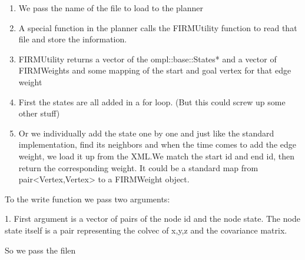 \begin{enumerate}
 \item We pass the name of the file to load to the planner
 \item A special function in the planner calls the FIRMUtility function to read that file and store the information.
 \item FIRMUtility returns a vector of the ompl::base::States* and a vector of FIRMWeights and some mapping of the start and goal vertex for that edge weight
 \item First the states are all added in a for loop. (But this could screw up some other stuff)
 \item Or we individually add the state one by one and just like the standard implementation, find its neighbors and when the time comes to add the edge weight, we load it up from the 
       XML.We match the start id and end id, then return the corresponding weight. It could be a standard map from pair<Vertex,Vertex> to a FIRMWeight object.
\end{enumerate}

To the write function we pass two arguments:

1. First argument is a vector of pairs of the node id and the node state. The node state itself is a pair representing the colvec of x,y,z and the covariance matrix.

So we pass the filen



































